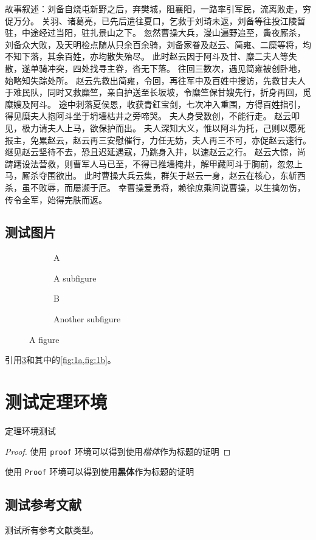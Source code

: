 故事叙述：刘备自烧屯新野之后，弃樊城，阻襄阳，一路率引军民，流离败走，穷促万分。
关羽、诸葛亮，已先后遣往夏口，乞救于刘琦未返，刘备等往投江陵暂驻，中途经过当阳，驻扎景山之下。
忽然曹操大兵，漫山遍野追至，夤夜厮杀，刘备众大败，及天明检点随从只余百余骑，刘备家眷及赵云、简雍、二糜等将，均不知下落，其余百姓，亦均散失殆尽。
此时赵云因于阿斗及甘、糜二夫人等失散，遂单骑冲突，四处找寻主眷，沓无下落。
往回三数次，遇见简雍被创卧地，始略知失踪处所。
赵云先救出简雍，令回，再往军中及百姓中搜访，先救甘夫人于难民队，同时又救糜竺，亲自护送至长坂坡，令糜竺保甘嫂先行，折身再回，觅糜嫂及阿斗。
途中刺落夏侯恩，收获青釭宝剑，七次冲入重围，方得百姓指引，得见糜夫人抱阿斗坐于坍墙枯井之旁啼哭。
夫人身受数创，不能行走。
赵云叩见，极力请夫人上马，欲保护而出。
夫人深知大义，惟以阿斗为托，己则以愿死报主，免累赵云，赵云再三安慰催行，力任无妨，夫人再三不可，亦促赵云速行。
继见赵云坚待不去，恐且迟延遇寇，乃跳身入井，以速赵云之行。
赵云大惊，尚踌躇设法营救，则曹军人马已至，不得已推墙掩井，解甲藏阿斗于胸前，忽忽上马，厮杀夺围欲出。
此时曹操大兵云集，群矢于赵云一身，赵云在核心，东斩西杀，虽不败辱，而屡濒于厄。
幸曹操爱勇将，赖徐庶乘间说曹操，以生擒勿伤，传令全军，始得完肤而返。

\subsection{测试图片}

\begin{figure}
    \begin{subfigure}[b]{.5\linewidth}
    \centering\large A
    \caption{A subfigure}\label{fig:1a}
    \end{subfigure}%
    \begin{subfigure}[b]{.5\linewidth}
    \centering\large B
    \caption{Another subfigure}\label{fig:1b}
    \end{subfigure}
    \caption[A figure]{A figure \protect\cite{CITATION_ARTICLE}}\label{fig:1}
\end{figure}

引用\cref{fig:1}和其中的\cref{fig:1a,fig:1b}。

\section{测试定理环境}
\begin{theorem}[定理名称]
    定理环境测试
\end{theorem}

\begin{proof}
    使用 \texttt{proof} 环境可以得到使用\emph{楷体}作为标题的证明
\end{proof}

\begin{Proof}
    使用 \texttt{Proof} 环境可以得到使用\textbf{黑体}作为标题的证明
\end{Proof}

\subsection{测试参考文献}
测试所有参考文献类型\cite{CITATION_BOOK,CITATION_ARTICLE,CITATION_PROCEEDINGS,CITATION_INPROCEEDINGS,CITATION_TECHREPORT,CITATION_STANDARD,CITATION_PATENT,CITATION_NEWSPAPER,CITATION_ELECTRONIC}。

\chapterbib

